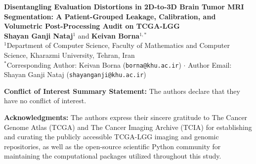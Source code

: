 \documentclass[10pt]{article}
\begin{document}
\thispagestyle{empty}
\enlargethispage{2\baselineskip}

\begin{center}
{\large \textbf{Disentangling Evaluation Distortions in 2D-to-3D Brain Tumor MRI Segmentation: A Patient-Grouped Leakage, Calibration, and Volumetric Post-Processing Audit on TCGA-LGG}}\\[0.5em]
{\normalsize \textbf{Shayan Ganji Nataj}$^1$ \quad and \quad \textbf{Keivan Borna}$^{1,*}$}\\[0.2em]
{\small $^1$Department of Computer Science, Faculty of Mathematics and Computer Science, Kharazmi University, Tehran, Iran}\\[0.15em]
{\footnotesize $^*$Corresponding Author: Keivan Borna (\texttt{borna@khu.ac.ir}) \quad $\cdot$ \quad Author Email: Shayan Ganji Nataj (\texttt{shayanganji@khu.ac.ir})}
\end{center}
\vspace{-0.2em}

\noindent\textbf{Conflict of Interest Summary Statement:}
The authors declare that they have no conflict of interest.

\vspace{0.2em}
\noindent\textbf{Acknowledgments:}
The authors express their sincere gratitude to The Cancer Genome Atlas (TCGA) and The Cancer Imaging Archive (TCIA) for establishing and curating the publicly accessible TCGA-LGG imaging and genomic repositories, as well as the open-source scientific Python community for maintaining the computational packages utilized throughout this study.
\end{document}
